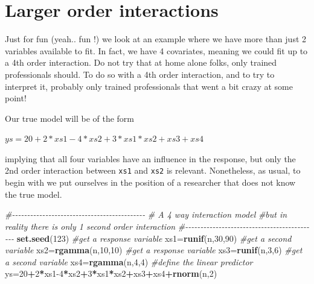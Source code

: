 \documentclass[
]{book}
\newenvironment{Shaded}{\begin{snugshade}}{\end{snugshade}}
\newcommand{\CommentTok}[1]{\textcolor[rgb]{0.56,0.35,0.01}{\textit{#1}}}
\newcommand{\DecValTok}[1]{\textcolor[rgb]{0.00,0.00,0.81}{#1}}
\newcommand{\FunctionTok}[1]{\textcolor[rgb]{0.13,0.29,0.53}{\textbf{#1}}}
\newcommand{\NormalTok}[1]{#1}
\newcommand{\OtherTok}[1]{\textcolor[rgb]{0.56,0.35,0.01}{#1}}
\newcommand{\SpecialCharTok}[1]{\textcolor[rgb]{0.81,0.36,0.00}{\textbf{#1}}}
\begin{document}
\section{Larger order interactions}\label{larger-order-interactions}

Just for fun (yeah.. fun !) we look at an example where we have more than just 2 variables available to fit. In fact, we have 4 covariates, meaning we could fit up to a 4th order interaction. Do not try that at home alone folks, only trained professionals should. To do so with a 4th order interaction, and to try to interpret it, probably only trained professionals that went a bit crazy at some point!

Our true model will be of the form

\(ys=20+2*xs1-4*xs2+3*xs1*xs2+xs3+xs4\)

implying that all four variables have an influence in the response, but only the 2nd order interaction between \texttt{xs1} and \texttt{xs2} is relevant. Nonetheless, as usual, to begin with we put ourselves in the position of a researcher that does not know the true model.

\begin{Shaded}
\begin{Highlighting}[]
\CommentTok{\#{-}{-}{-}{-}{-}{-}{-}{-}{-}{-}{-}{-}{-}{-}{-}{-}{-}{-}{-}{-}{-}{-}{-}{-}{-}{-}{-}{-}{-}{-}{-}{-}{-}{-}{-}{-}{-}{-}{-}{-}{-}{-}{-}{-}}
\CommentTok{\# A 4 way interaction model}
\CommentTok{\#but in reality there is only 1 second order interaction}
\CommentTok{\#{-}{-}{-}{-}{-}{-}{-}{-}{-}{-}{-}{-}{-}{-}{-}{-}{-}{-}{-}{-}{-}{-}{-}{-}{-}{-}{-}{-}{-}{-}{-}{-}{-}{-}{-}{-}{-}{-}{-}{-}{-}{-}{-}{-}}
\FunctionTok{set.seed}\NormalTok{(}\DecValTok{123}\NormalTok{)}
\CommentTok{\#get a response variable}
\NormalTok{xs1}\OtherTok{=}\FunctionTok{runif}\NormalTok{(n,}\DecValTok{30}\NormalTok{,}\DecValTok{90}\NormalTok{)}
\CommentTok{\#get a second variable}
\NormalTok{xs2}\OtherTok{=}\FunctionTok{rgamma}\NormalTok{(n,}\DecValTok{10}\NormalTok{,}\DecValTok{10}\NormalTok{)}
\CommentTok{\#get a response variable}
\NormalTok{xs3}\OtherTok{=}\FunctionTok{runif}\NormalTok{(n,}\DecValTok{3}\NormalTok{,}\DecValTok{6}\NormalTok{)}
\CommentTok{\#get a second variable}
\NormalTok{xs4}\OtherTok{=}\FunctionTok{rgamma}\NormalTok{(n,}\DecValTok{4}\NormalTok{,}\DecValTok{4}\NormalTok{)}
\CommentTok{\#define the linear predictor}
\NormalTok{ys}\OtherTok{=}\DecValTok{20}\SpecialCharTok{+}\DecValTok{2}\SpecialCharTok{*}\NormalTok{xs1}\DecValTok{{-}4}\SpecialCharTok{*}\NormalTok{xs2}\SpecialCharTok{+}\DecValTok{3}\SpecialCharTok{*}\NormalTok{xs1}\SpecialCharTok{*}\NormalTok{xs2}\SpecialCharTok{+}\NormalTok{xs3}\SpecialCharTok{+}\NormalTok{xs4}\SpecialCharTok{+}\FunctionTok{rnorm}\NormalTok{(n,}\DecValTok{2}\NormalTok{)}
\end{Highlighting}
\end{Shaded}
\end{document}
